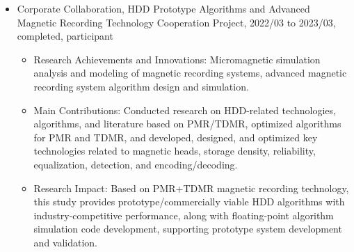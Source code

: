 \documentclass[en]{resume}
\begin{document}
\begin{itemize}
  \item Corporate Collaboration, HDD Prototype Algorithms and Advanced Magnetic Recording Technology Cooperation Project, 2022/03 to 2023/03, completed, participant
  \begin{itemize}
    \item Research Achievements and Innovations: Micromagnetic simulation analysis and modeling of magnetic recording systems, advanced magnetic recording system algorithm design and simulation.
    \item Main Contributions: Conducted research on HDD-related technologies, algorithms, and literature based on PMR/TDMR, optimized algorithms for PMR and TDMR, and developed, designed, and optimized key technologies related to magnetic heads, storage density, reliability, equalization, detection, and encoding/decoding.
    \item Research Impact: Based on PMR+TDMR magnetic recording technology, this study provides prototype/commercially viable HDD algorithms with industry-competitive performance, along with floating-point algorithm simulation code development, supporting prototype system development and validation.
  \end{itemize}
\end{itemize}

\end{document}

